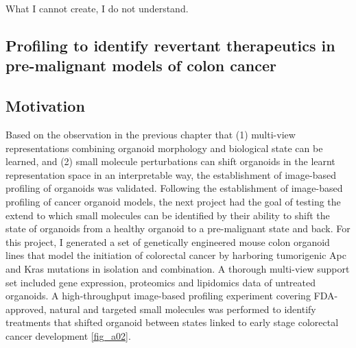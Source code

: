 \begin{savequote}[75mm]
What I cannot create, I do not understand.
\end{savequote}

\begin{flushleft}
\chapter{Profiling to identify revertant therapeutics in pre-malignant models of colon cancer}

\section{Motivation}

Based on the observation in the previous chapter that (1) multi-view representations combining organoid morphology and biological state can be learned, and (2) small molecule perturbations can shift organoids in the learnt representation space in an interpretable way, the establishment of image-based profiling of organoids was validated. Following the establishment of image-based profiling of cancer organoid models, the next project had the goal of testing the extend to which small molecules can be identified by their ability to shift the state of organoids from a healthy organoid to a pre-malignant state and back. For this project, I generated a set of genetically engineered mouse colon organoid lines that model the initiation of colorectal cancer by harboring tumorigenic Apc and Kras mutations in isolation and combination. A thorough multi-view support set included gene expression, proteomics and lipidomics data of untreated organoids. A high-throughput image-based profiling experiment covering FDA-approved, natural and targeted small molecules was performed to identify treatments that shifted organoid between states linked to early stage colorectal cancer development \ref{fig_a02}. 



\end{flushleft}
